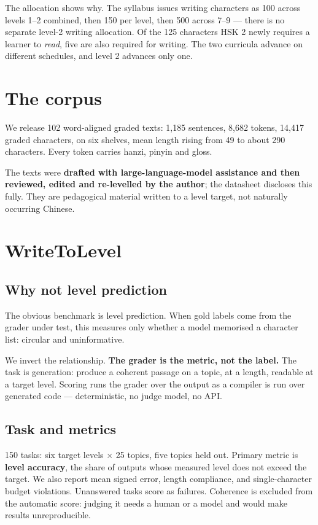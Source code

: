 \documentclass[11pt]{article}
\begin{document}
The allocation shows why. The syllabus issues writing characters as 100 across
levels 1--2 combined, then 150 per level, then 500 across 7--9 --- there is no
separate level-2 writing allocation. Of the 125 characters HSK 2 newly requires
a learner to \emph{read}, five are also required for writing. The two curricula
advance on different schedules, and level 2 advances only one.

\section{The corpus}
\label{sec:corpus}

We release 102 word-aligned graded texts: 1{,}185 sentences, 8{,}682 tokens,
14{,}417 graded characters, on six shelves, mean length rising from 49 to about
290 characters. Every token carries hanzi, pinyin and gloss.

The texts were \textbf{drafted with large-language-model assistance and then
reviewed, edited and re-levelled by the author}; the datasheet discloses this
fully. They are pedagogical material written to a level target, not naturally
occurring Chinese.

\section{WriteToLevel}
\label{sec:bench}

\subsection{Why not level prediction}

The obvious benchmark is level prediction. When gold labels come from the
grader under test, this measures only whether a model memorised a character
list: circular and uninformative.

We invert the relationship. \textbf{The grader is the metric, not the label.}
The task is generation: produce a coherent passage on a topic, at a length,
readable at a target level. Scoring runs the grader over the output as a
compiler is run over generated code --- deterministic, no judge model, no API.

\subsection{Task and metrics}

150 tasks: six target levels $\times$ 25 topics, five topics held out. Primary
metric is \textbf{level accuracy}, the share of outputs whose measured level
does not exceed the target. We also report mean signed error, length
compliance, and single-character budget violations. Unanswered tasks score as
failures. Coherence is excluded from the automatic score: judging it needs a
human or a model and would make results unreproducible.
\end{document}
